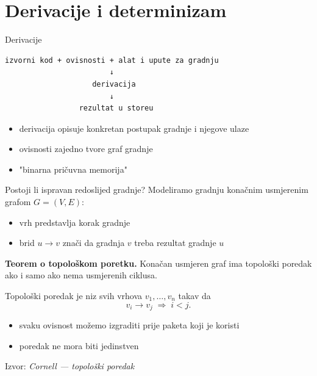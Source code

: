 \documentclass{beamer}
\begin{document}
\section{Derivacije i determinizam}

\begin{frame}[fragile]{Derivacije}
	\begin{lstlisting}
izvorni kod + ovisnosti + alat i upute za gradnju
                        ↓
                    derivacija
                        ↓
                 rezultat u storeu
\end{lstlisting}
	\begin{itemize}
		\item derivacija opisuje konkretan postupak gradnje i njegove ulaze
		\item ovisnosti zajedno tvore graf gradnje
		\item "binarna pričuvna memorija"
	\end{itemize}
\end{frame}

\begin{frame}{Postoji li ispravan redoslijed gradnje?}
	Modeliramo gradnju konačnim usmjerenim grafom $G = (V, E)$:
	\begin{itemize}
		\item vrh predstavlja korak gradnje
		\item brid $u \to v$ znači da gradnja $v$ treba rezultat gradnje $u$
	\end{itemize}

	\vspace{0.4em}
	\textbf{Teorem o topološkom poretku.} Konačan usmjeren graf ima topološki poredak ako i samo ako nema usmjerenih ciklusa.

	Topološki poredak je niz svih vrhova $v_1, \ldots, v_n$ takav da
	\[ v_i \to v_j \;\Longrightarrow\; i < j. \]

	\begin{itemize}
		\item svaku ovisnost možemo izgraditi prije paketa koji je koristi
		\item poredak ne mora biti jedinstven
	\end{itemize}

	\vfill
	{\scriptsize Izvor: \emph{Cornell --- topološki poredak} \cite{cornell-topological-sort}}
\end{frame}
\end{document}
